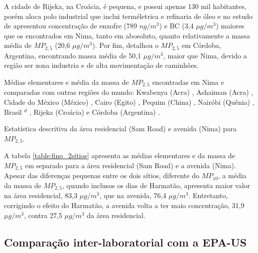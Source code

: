 A cidade de Rijeka, na Croácia, é pequena, e possui apenas 130 mil habitantes, 
porém aloca polo industrial que inclui terméletrica e refinaria de óleo
e no estudo de \citep{ivovsevic2015} apresentou concentração de enxofre
(789 $ng / m^3$) e BC (3,4 $\mu g / m^3$) maiores que os encontrados em Nima, 
tanto em abosoluto, quanto relativamente a massa média de $MP_{2,5}$ 
(20,6 $\mu g / m^3$). 
Por fim, \citet{achad2014} detalhou o $MP_{2,5}$ em Córdoba, Argentina, 
encontrando massa média de 50,1 $\mu g / m^3$, maior que Nima, devido a região
ser zona industria e de alta movimentação de caminhões.   

\begin{landscape}
  \begin{table}[H]
    \centering
    
    \caption{Médias elementares e média da massa de $MP_{2,5}$ encontradas
             em Nima e comparadas com outras regiões do mundo:
             Kwabenya (Acra) \citep{aboh2009},
             Ashaiman (Acra) \citep{ofosu2012},
             Cidade do México (México) \citep{diaz2014},
             Cairo (Egito) \citep{boman2013},
             Pequim (China) \citep{yang2011},
             Nairóbi (Quênia)  \citep{gaita2014},
             Brasil $^d$ \citep{andrade2012urban},
             Rijeka (Croácia) \citep{ivovsevic2015} e
             Córdoba (Argentina) \citep{achad2014}.
             \label{table:fino_in_the_world}}
  \end{table} 
\end{landscape}

\begin{table}[H]
  \centering
    
  \caption{Estatística descritiva da área residencial (Sam Road) e avenida (Nima) 
           para $MP_{2,5}$. \label{table:fino_2sitios}}
\end{table}

A tabela \ref{table:fino_2sitios} apresenta as médias elementares e
da massa de $MP_{2,5}$ em separado para a área residencial (Sam Road) e
a avenida (Nima). Apesar das diferenças pequenas entre os dois sítios, 
diferente do $MP_{10}$, a média da massa de $MP_{2,5}$, quando inclusos os dias
de Harmatão, apresenta maior valor na área residencial, 83,3 $\mu g / m^3$,
que na avenida, 76,4 $\mu g / m^3$. Entretanto, corrigindo o efeito do Harmatão,
a avenida volta a ter maio concentração, 31,9 $\mu g / m^3$, contra 27,5 
$\mu g / m^3$  da área residencial.

\subsection{Comparação inter-laboratorial com a EPA-US}

